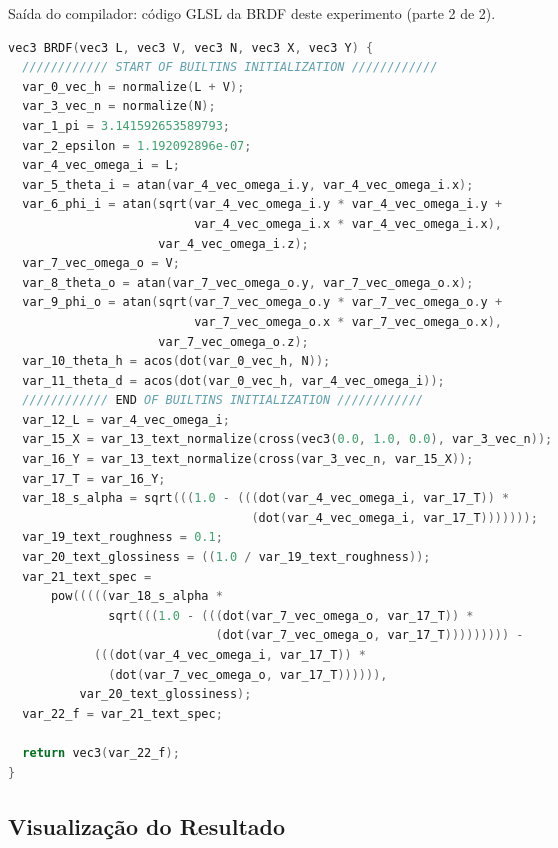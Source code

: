 \begin{codigo}[H]
    \caption{\small Saída do compilador: código GLSL da BRDF deste experimento (parte 2 de 2).}
    \label{cod-kajiya-glsl-pt-2}
\begin{lstlisting}[language=C, inputencoding=utf8]
vec3 BRDF(vec3 L, vec3 V, vec3 N, vec3 X, vec3 Y) {
  //////////// START OF BUILTINS INITIALIZATION ////////////
  var_0_vec_h = normalize(L + V);
  var_3_vec_n = normalize(N);
  var_1_pi = 3.141592653589793;
  var_2_epsilon = 1.192092896e-07;
  var_4_vec_omega_i = L;
  var_5_theta_i = atan(var_4_vec_omega_i.y, var_4_vec_omega_i.x);
  var_6_phi_i = atan(sqrt(var_4_vec_omega_i.y * var_4_vec_omega_i.y +
                          var_4_vec_omega_i.x * var_4_vec_omega_i.x),
                     var_4_vec_omega_i.z);
  var_7_vec_omega_o = V;
  var_8_theta_o = atan(var_7_vec_omega_o.y, var_7_vec_omega_o.x);
  var_9_phi_o = atan(sqrt(var_7_vec_omega_o.y * var_7_vec_omega_o.y +
                          var_7_vec_omega_o.x * var_7_vec_omega_o.x),
                     var_7_vec_omega_o.z);
  var_10_theta_h = acos(dot(var_0_vec_h, N));
  var_11_theta_d = acos(dot(var_0_vec_h, var_4_vec_omega_i));
  //////////// END OF BUILTINS INITIALIZATION ////////////
  var_12_L = var_4_vec_omega_i;
  var_15_X = var_13_text_normalize(cross(vec3(0.0, 1.0, 0.0), var_3_vec_n));
  var_16_Y = var_13_text_normalize(cross(var_3_vec_n, var_15_X));
  var_17_T = var_16_Y;
  var_18_s_alpha = sqrt(((1.0 - (((dot(var_4_vec_omega_i, var_17_T)) *
                                  (dot(var_4_vec_omega_i, var_17_T)))))));
  var_19_text_roughness = 0.1;
  var_20_text_glossiness = ((1.0 / var_19_text_roughness));
  var_21_text_spec =
      pow(((((var_18_s_alpha *
              sqrt(((1.0 - (((dot(var_7_vec_omega_o, var_17_T)) *
                             (dot(var_7_vec_omega_o, var_17_T))))))))) -
            (((dot(var_4_vec_omega_i, var_17_T)) *
              (dot(var_7_vec_omega_o, var_17_T)))))),
          var_20_text_glossiness);
  var_22_f = var_21_text_spec;

  return vec3(var_22_f);
}


\end{lstlisting}
\end{codigo}

\subsection{Visualização do Resultado}

